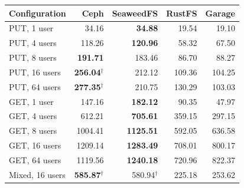 \begin{tabular}{lrrrr}
\toprule
Configuration & Ceph & SeaweedFS & RustFS & Garage \\
\midrule
PUT, 1 user & 34.16 & \textbf{34.88} & 19.54 & 19.10 \\
PUT, 4 users & 118.26 & \textbf{120.96} & 58.32 & 67.50 \\
PUT, 8 users & \textbf{191.71} & 183.46 & 86.70 & 88.27 \\
PUT, 16 users & \textbf{256.04}$^{\dagger}$ & 212.12 & 109.36 & 104.25 \\
PUT, 64 users & \textbf{277.35}$^{\dagger}$ & 210.75 & 130.29 & 103.03 \\
\midrule
GET, 1 user & 147.16 & \textbf{182.12} & 90.35 & 47.97 \\
GET, 4 users & 612.21 & \textbf{705.61} & 359.15 & 297.15 \\
GET, 8 users & 1004.41 & \textbf{1125.51} & 592.05 & 636.58 \\
GET, 16 users & 1209.14 & \textbf{1283.49} & 708.01 & 800.17 \\
GET, 64 users & 1119.56 & \textbf{1240.18} & 720.96 & 822.37 \\
\midrule
Mixed, 16 users & \textbf{585.87}$^{\dagger}$ & 580.94$^{\dagger}$ & 225.18 & 253.62 \\
\bottomrule
\end{tabular}
